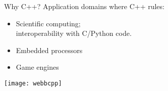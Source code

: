 \begin{block}{Why C++?}
  \label{sl:webb}
  Application domains where C++ rules:
  \begin{itemize}
  \item Scientific computing;\\
    interoperability with C/Python code.
  \item Embedded processors
  \item Game engines
  \end{itemize}
  \texttt{[image: webbcpp]}
\end{block}

\endinput

\Level 0 {Further reading}

Tutorial, assignments:
\url{http://www.cppforschool.com/}

Problems to practice:
\url{http://www.spoj.com/problems/classical/}
